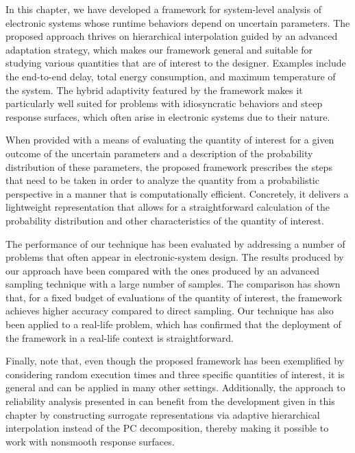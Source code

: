In this chapter, we have developed a framework for system-level analysis of
electronic systems whose runtime behaviors depend on uncertain parameters. The
proposed approach thrives on hierarchical interpolation guided by an advanced
adaptation strategy, which makes our framework general and suitable for studying
various quantities that are of interest to the designer. Examples include the
end-to-end delay, total energy consumption, and maximum temperature of the
system. The hybrid adaptivity featured by the framework makes it particularly
well suited for problems with idiosyncratic behaviors and steep response
surfaces, which often arise in electronic systems due to their nature.

When provided with a means of evaluating the quantity of interest for a given
outcome of the uncertain parameters and a description of the probability
distribution of these parameters, the proposed framework prescribes the steps
that need to be taken in order to analyze the quantity from a probabilistic
perspective in a manner that is computationally efficient. Concretely, it
delivers a lightweight representation that allows for a straightforward
calculation of the probability distribution and other characteristics of the
quantity of interest.

The performance of our technique has been evaluated by addressing a number of
problems that often appear in electronic-system design. The results produced by
our approach have been compared with the ones produced by an advanced sampling
technique with a large number of samples. The comparison has shown that, for a
fixed budget of evaluations of the quantity of interest, the framework achieves
higher accuracy compared to direct sampling. Our technique has also been applied
to a real-life problem, which has confirmed that the deployment of the framework
in a real-life context is straightforward.

Finally, note that, even though the proposed framework has been exemplified by
considering random execution times and three specific quantities of interest, it
is general and can be applied in many other settings. Additionally, the approach
to reliability analysis presented in  can
benefit from the development given in this chapter by constructing surrogate
representations via adaptive hierarchical interpolation instead of the \ac{PC}
decomposition, thereby making it possible to work with nonsmooth response
surfaces.
